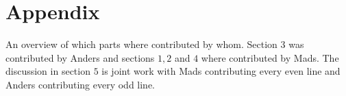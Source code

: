 \section*{Appendix}
\label{sec:appendix}

An overview of which parts where contributed by whom. Section $3$ was contributed by Anders and sections $1,2$ and $4$ where contributed by Mads. The discussion in section $5$ is joint work with Mads contributing every even line and Anders contributing every odd line. 
